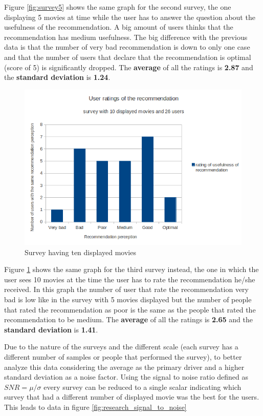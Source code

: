 Figure \ref{fig:survey5} shows the same graph for the second survey, the one displaying 5 movies at time while the user has to answer the question about the usefulness of the recommendation. A big amount of users thinks that the recommendation has medium usefulness. The big difference with the previous data is that the number of very bad recommendation is down to only one case and that the number of users that declare that the recommendation is optimal (score of 5) is significantly dropped. The \textbf{average} of all the ratings is \textbf{2.87} and the \textbf{standard deviation} is \textbf{1.24}.

\begin{figure}
  \centering
  \includegraphics[width=\textwidth]{figures/survey10_graph1.png}
  \caption{Survey having ten displayed movies}
  \label{fig:survey10}
\end{figure}

Figure \ref{fig:survey10} shows the same graph for the third survey instead, the one in which the user sees 10 movies at the time the user has to rate the recommendation he/she received. In this graph the number of user that rate the recommendation very bad is low like in the survey with 5 movies displayed but the number of people that rated the recommendation as poor is the same as the people that rated the recommendation to be medium. The \textbf{average} of all the ratings is \textbf{2.65} and the \textbf{standard deviation} is \textbf{1.41}.

Due to the nature of the surveys and the different scale (each survey has a different number of samples or people that performed the survey), to better analyze this data considering the average as the primary driver and a higher standard deviation as a noise factor. Using the signal to noise ratio defined as 
\begin{math}
SNR=\mu/\sigma  
\end{math}
every survey can be reduced to a single scalar indicating which survey that had a different number of displayed movie was the best for the users. This leads to data in figure \ref{fig:research_signal_to_noise}

